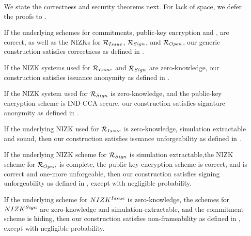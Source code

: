 We state the correctness and security theorems next. For lack of space, we defer
the proofs to .

\begin{theorem}
  \label{thm:correctness-uas}
  If the underlying schemes for commitments, public-key encryption and \SBCM,
  are correct, as well as the NIZKs for $\mathcal{R}_{Issue}$, $\mathcal{R}_{Sign}$,
  and $\mathcal{R}_{Open}$, our generic construction \CUASGen satisfies
  correctness as defined in .
\end{theorem}

\begin{theorem}
  \label{thm:issue-anonymity-uas}
  If the NIZK systems used for $\mathcal{R}_{Issue}$ and $\mathcal{R}_{Sign}$ are
  zero-knowledge, our \CUASGen construction satisfies issuance anonymity as
  defined in .
\end{theorem}

\begin{theorem}
  \label{thm:sign-anonymity-uas}
  If the NIZK system used for $\mathcal{R}_{Sign}$ is zero-knowledge, and the
  public-key encryption scheme is IND-CCA secure, our \CUASGen construction
  satisfies signature anonymity as defined in .
\end{theorem}

\begin{theorem}
  \label{thm:issue-forge-uas}
  If the underlying NIZK used for $\mathcal{R}_{Issue}$ is zero-knowledge,
  simulation extractable and sound, then our \CUASGen construction satisfies
  issuance unforgeability as defined in .
\end{theorem}

\begin{theorem}
  \label{thm:sign-forge-uas}
  If the underlying NIZK scheme for $\mathcal{R}_{Sign}$ is simulation
  extractable,the NIZK scheme for $\mathcal{R}_{Open}$ is complete, the public-key
  encryption scheme is correct, and \SBCM is correct and one-more unforgeable,
  then our \CUASGen construction satisfies signing unforgeability as defined in
  , except with negligible probability.
\end{theorem}

\begin{theorem}
  \label{thm:frame-uas}
  If the underlying scheme for $NIZK^{Issue}$ is zero-knowledge, the schemes
  for $NIZK^{Sign}$ are zero-knowledge and simulation-extractable, and the
  commitment scheme is hiding, then our \CUASGen construction satisfies
  non-frameability as defined in , except with negligible
  probability.
\end{theorem}

